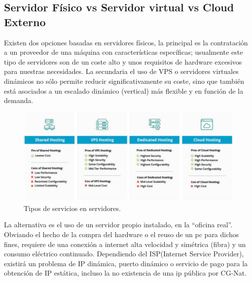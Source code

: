 \subsection{Servidor Físico vs Servidor virtual vs Cloud Externo}
Existen dos opciones basadas en servidores físicos, la principal es la contratación a un proveedor de una máquina con características específicas; usualmente este tipo de servidores son de un coste alto y unos requisitos de hardware excesivos para nuestras necesidades. La secundaria el uso de VPS o servidores virtuales dinámicos no sólo permite reducir significativamente su coste, sino que también está asociados a un escalado dinámico (vertical) más flexible y en función de la demanda.

\begin{figure}[!htb]
\begin{center}
\includegraphics[width=1\textwidth]{./figuras/servidores_typos_servicios.jpg}
\caption{Tipos de servicios en servidores\cite{i_vps}.}
\label{F:servidores_typos_servicios}
\end{center}
\end{figure}

La alternativa es el uso de un servidor propio instalado, en la “oficina real”. Obviando el hecho de la compra del hardware o el reuso de un pc para dichos fines, requiere de una conexión a internet alta velocidad y simétrica (fibra) y un consumo eléctrico continuado. Dependiendo del ISP(Internet Service Provider), existirá un problema de IP dinámica, puerto dinámico o servicio de pago para la obtención de IP estática, incluso la no existencia de una ip pública por CG-Nat\cite{c_cg_nat}.

